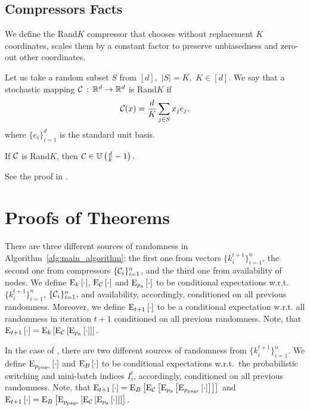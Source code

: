 \documentclass{article}
\newcommand{\algorithmname}{DASHA-PP}
\newcommand*{\probavailable}{\ensuremath{p_{\textnormal{a}}}}
\newcommand*{\probpage}{\ensuremath{p_{\text{page}}}}
\begin{document}
\subsection{Compressors Facts}

We define the Rand$K$ compressor that chooses without replacement $K$ coordinates, scales them by a constant factor to preserve unbiasedness and zero-out other coordinates.
\begin{definition}
    \label{def:rand_k}
    Let us take a random subset $S$ from $[d],$ $|S| = K,$ $K \in [d].$ We say that a stochastic mapping $\mathcal{C}\,:\, \mathbb{R}^d \rightarrow \mathbb{R}^d$ is Rand$K$ if
    $$\mathcal{C}(x) = \frac{d}{K} \sum_{j \in S} x_j e_j,$$ where $\{e_i\}_{i=1}^d$ is the standard unit basis.
\end{definition}

\begin{theorem}
    \label{theorem:rand_k}
    If $\mathcal{C}$ is Rand$K$, then $\mathcal{C} \in \mathbb{U}\left(\frac{d}{k} - 1\right).$
\end{theorem}
See the proof in \cite{beznosikov2020biased}.

\section{Proofs of Theorems}
\label{sec:proof_of_theorems}

There are three different sources of randomness in Algorithm~\ref{alg:main_algorithm}: the first one from vectors $\{k_i^{t+1}\}_{i=1}^n$, the second one from compressors $\{\mathcal{C}_i\}_{i=1}^n$, and the third one from availability of nodes. We define ${\rm E}_{k}\left[\cdot\right]$, ${\rm E}_{\mathcal{C}}\left[\cdot\right]$ and $\ExpSub{\probavailable}{\cdot}$ to be conditional expectations w.r.t.\,$\{k_i^{t+1}\}_{i=1}^n$, $\{\mathcal{C}_i\}_{i=1}^n, $ and availability, accordingly, conditioned on all previous randomness. Moreover, we define ${\rm E}_{t+1}\left[\cdot\right]$ to be a conditional expectation w.r.t. all randomness in iteration $t+1$ conditioned on all previous randomness. Note, that $\ExpSub{t+1}{\cdot} = \ExpSub{k}{\ExpSub{\cC}{\ExpSub{\probavailable}{\cdot}}}.$

In the case of \algname{\algorithmname-PAGE}, there are two different sources of randomness from $\{k_i^{t+1}\}_{i=1}^n$. We define $\ExpSub{\probpage}{\cdot}$ and ${\rm E}_{B}\left[\cdot\right]$ to be conditional expectations w.r.t.\, the probabilistic switching and mini-batch indices $I_{i}^t$, accordingly, conditioned on all previous randomness. Note, that $\ExpSub{t+1}{\cdot} = \ExpSub{B}{\ExpSub{\cC}{\ExpSub{\probavailable}{\ExpSub{\probpage}{\cdot}}}}$ and $\ExpSub{t+1}{\cdot} = \ExpSub{B}{\ExpSub{\probpage}{\ExpSub{\cC}{\ExpSub{\probavailable}{\cdot}}}}.$
\end{document}
